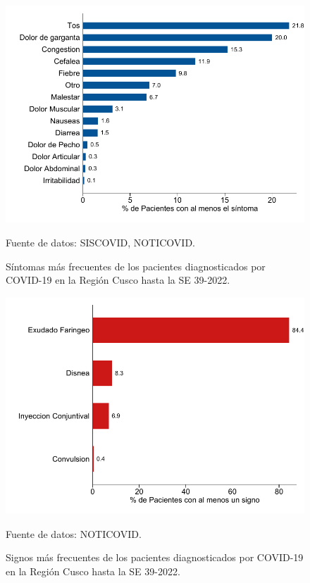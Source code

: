 \documentclass[12pt,a4paper,openany]{book}
\begin{document}
	 
	
	\begin{figure}[h]
		\caption{Síntomas más frecuentes de los pacientes diagnosticados por COVID-19 en la Región Cusco hasta la SE 39-2022.  }\label{fig:sintomas}
		\begin{center}
			\includegraphics[width=0.85\linewidth]{../figuras/figura_sintoma.pdf}
		\end{center}
		{\footnotesize {Fuente de datos: SISCOVID, NOTICOVID.}}
	\end{figure}
	
	\begin{figure}[h]
		\caption{Signos más frecuentes de los pacientes diagnosticados por COVID-19 en la Región Cusco hasta la SE 39-2022.}\label{fig:signos}
		\begin{center}
			\includegraphics[width=0.65\linewidth]{../figuras/figura_signo.pdf}
		\end{center}
		{\footnotesize {Fuente de datos: NOTICOVID.}}
	\end{figure}
	
	
	  
\end{document}
